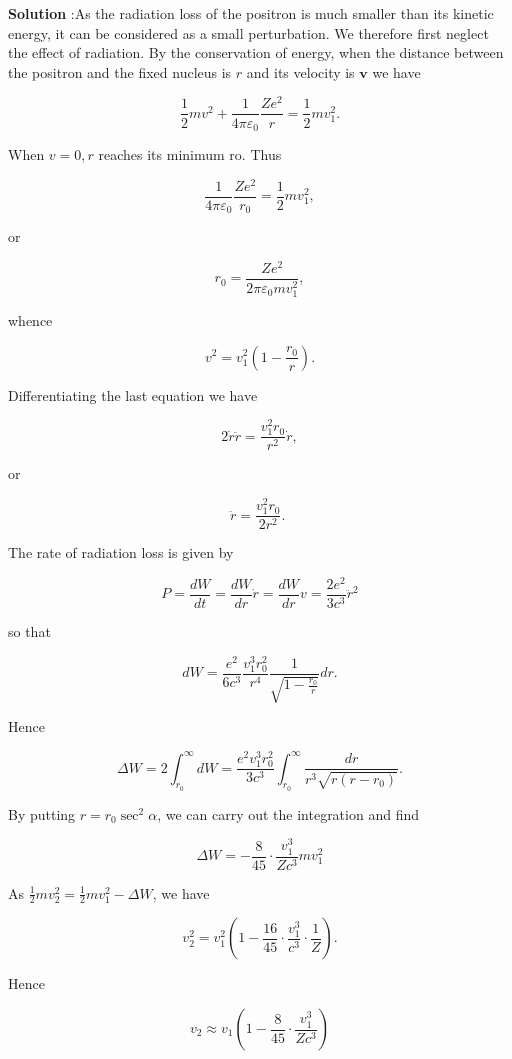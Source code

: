 \documentclass[10pt]{article}
\begin{document}
\textbf{Solution} :As the radiation loss of the positron is much smaller than its kinetic energy, it can be considered as a small perturbation. We therefore first neglect the effect of radiation. By the conservation of energy, when the distance between the positron and the fixed nucleus is $r$ and its velocity is $\boldsymbol{v}$ we have

$$
\frac{1}{2} m v^{2}+\frac{1}{4 \pi \varepsilon_{0}} \frac{Z e^{2}}{r}=\frac{1}{2} m v_{1}^{2} .
$$

When $v=0, r$ reaches its minimum ro. Thus

$$
\frac{1}{4 \pi \varepsilon_{0}} \frac{Z e^{2}}{r_{0}}=\frac{1}{2} m v_{1}^{2},
$$

or

$$
r_{0}=\frac{Z e^{2}}{2 \pi \varepsilon_{0} m v_{1}^{2}},
$$

whence

$$
v^{2}=v_{1}^{2}\left(1-\frac{r_{0}}{r}\right) .
$$

Differentiating the last equation we have

$$
2 \dot{r} \ddot{r}=\frac{v_{1}^{2} r_{0}}{r^{2}} \dot{r},
$$

or

$$
\ddot{r}=\frac{v_{1}^{2} r_{0}}{2 r^{2}} \text {. }
$$

The rate of radiation loss is given by

$$
P=\frac{d W}{d t}=\frac{d W}{d r} \dot{r}=\frac{d W}{d r} v=\frac{2 e^{2}}{3 c^{3}} \ddot{r}^{2}
$$

so that

$$
d W=\frac{e^{2}}{6 c^{3}} \frac{v_{1}^{3} r_{0}^{2}}{r^{4}} \frac{1}{\sqrt{1-\frac{r_{0}}{r}}} d r .
$$

Hence

$$
\Delta W=2 \int_{r_{0}}^{\infty} d W=\frac{e^{2} v_{1}^{3} r_{0}^{2}}{3 c^{3}} \int_{r_{0}}^{\infty} \frac{d r}{r^{3} \sqrt{r\left(r-r_{0}\right)}} .
$$

By putting $r=r_{0} \sec ^{2} \alpha$, we can carry out the integration and find

$$
\Delta W=-\frac{8}{45} \cdot \frac{v_{1}^{3}}{Z c^{3}} m v_{1}^{2}
$$

As $\frac{1}{2} m v_{2}^{2}=\frac{1}{2} m v_{1}^{2}-\Delta W$, we have

$$
v_{2}^{2}=v_{1}^{2}\left(1-\frac{16}{45} \cdot \frac{v_{1}^{3}}{c^{3}} \cdot \frac{1}{Z}\right) .
$$

Hence

$$
v_{2} \approx v_{1}\left(1-\frac{8}{45} \cdot \frac{v_{1}^{3}}{Z c^{3}}\right)
$$
\end{document}
